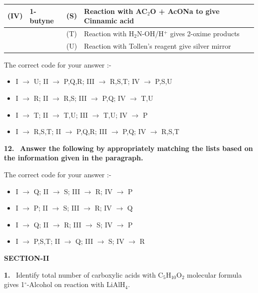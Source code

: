 \documentclass[10pt]{extarticle}
\newcommand{\sect}[1]{\par\smallskip\noindent\textbf{#1}\par}
\newcommand{\qn}[1]{\par\smallskip\noindent\textbf{#1.}~}
\newenvironment{qoptions}{\begin{itemize}[leftmargin=1.8em,itemsep=1pt,topsep=2pt,label={}]}{\end{itemize}}
\newcommand{\opt}[2]{\item[(#1)] #2}
\begin{document}
\begin{multicols}{2}
{\begin{tabular}{|L{.8cm}|L{2.0cm}|L{.8cm}|L{3.3cm}|}
(IV) & 1-butyne & (S) & Reaction with AC$_2$O + AcONa to give Cinnamic acid\\\hline
 & & (T) & Reaction with H$_2$N-OH/H$^+$ gives 2-oxime products\\\hline
 & & (U) & Reaction with Tollen's reagent give silver mirror\\\hline
\end{tabular}}\par
The correct code for your answer :-
\begin{qoptions}
\opt{A}{I $\to$ U; II $\to$ P,Q,R; III $\to$ R,S,T; IV $\to$ P,S,U}
\opt{B}{I $\to$ R; II $\to$ R,S; III $\to$ P,Q; IV $\to$ T,U}
\opt{C}{I $\to$ T; II $\to$ T,U; III $\to$ T,U; IV $\to$ P}
\opt{D}{I $\to$ R,S,T; II $\to$ P,Q,R; III $\to$ P,Q; IV $\to$ R,S,T}
\end{qoptions}
\qn{12} \textbf{Answer the following by appropriately matching the lists based on the information given in the paragraph.}\par
\smallskip
{}\par
The correct code for your answer :-
\begin{qoptions}
\opt{A}{I $\to$ Q; II $\to$ S; III $\to$ R; IV $\to$ P}
\opt{B}{I $\to$ P; II $\to$ S; III $\to$ R; IV $\to$ Q}
\opt{C}{I $\to$ Q; II $\to$ R; III $\to$ S; IV $\to$ P}
\opt{D}{I $\to$ P,S,T; II $\to$ Q; III $\to$ S; IV $\to$ R}
\end{qoptions}
\sect{SECTION-II}
\qn{1} Identify total number of carboxylic acids with C$_5$H$_{10}$O$_2$ molecular formula gives 1$^\circ$-Alcohol on reaction with LiAlH$_4$.

\end{multicols}
\end{document}
